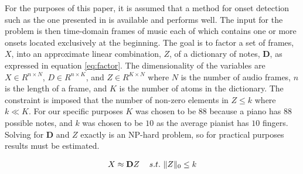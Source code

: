 For the purposes of this paper, it is assumed that a method for onset detection such as the one presented in \cite{bock_evaluating_nodate} is available and performs well.  The input for the problem is then time-domain frames of music each of which contains one or more onsets located exclusively at the beginning. The goal is to factor a set of frames, $X$, into an approximate linear combination, $Z$, of a dictionary of notes, $\mathbf{D}$, as expressed in equation \eqref{eq:factor}. The dimensionality of the variables are $X \in R^{n\times N}$, $D\in R^{n\times K}$, and $Z \in R^{K \times N}$ where $N$ is the number of audio frames, $n$ is the length of a frame, and $K$ is the number of atoms in the dictionary. The constraint is imposed that the number of non-zero elements in $Z \le k$ where $k \ll K$. For our specific purposes $K$ was chosen to be $88$ because a piano has $88$ possible notes, and $k$ was chosen to be $10$ as the average pianist has $10$ fingers. Solving for $\mathbf{D}$ and $Z$ exactly is an NP-hard problem, so for practical purposes results must be estimated.

\begin{equation}
\begin{tabular}{cr}
	$X \approx \mathbf{D}Z$ & $s.t.\ \|Z\|_0 \le k$
\end{tabular}
\label{eq:factor}
\end{equation}
